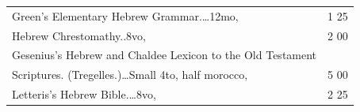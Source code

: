 \documentclass[a4paper,12pt]{book}[2004/02/16]
\theoremstyle{ilemma}
\theoremstyle{itheorem}
\theoremstyle{iother}
\theoremstyle{icorollary}
\theoremstyle{numcorollary}
\theoremstyle{idefinition}
\begin{document}
\begin{longtable}{@{}l@{ }r@{}}
\nopagebreak

Green's Elementary Hebrew Grammar.\dotfill\ldots 12mo, &1 25\\

\indent Hebrew Chrestomathy..\dotfill 8vo, &2 00\\

Gesenius's Hebrew and Chaldee Lexicon to the Old Testament\\

\nopagebreak

\indent\indent Scriptures. (Tregelles.)\dotfill\ldots Small 4to, half
morocco, &5 00\\

Letteris's Hebrew Bible.\dotfill\ldots 8vo, &2 25\\


\end{longtable}

\newpage
\end{document}
